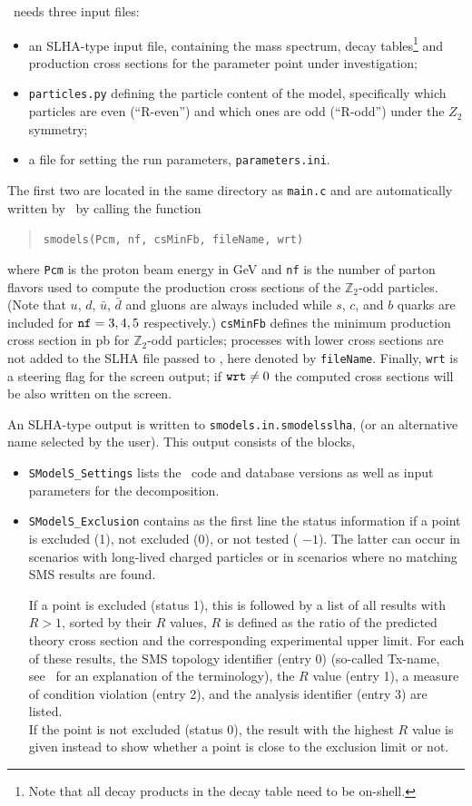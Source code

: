 \documentclass[12pt,a4paper]{article}
\begin{document}
{\smodels\ needs three input files:
%
\begin{itemize}
\item an SLHA-type input file,  
containing the mass
spectrum, decay tables\footnote{Note that all decay products in the decay table need to be on-shell.} and production cross sections for the parameter point under investigation;
\item {\tt particles.py} defining the particle content of the model, specifically which particles are even (``R-even'') 
and which ones are odd (``R-odd'') under the ${Z}_2$ symmetry;
\item a file for setting the run parameters, {\tt parameters.ini}.
\end{itemize}
%
 The first two are located in the same directory as {\tt main.c} and 
are automatically written by \micro\ by calling the function
\begin{quote}
  \verb|smodels(Pcm, nf, csMinFb, fileName, wrt)|
\end{quote}  
where \verb|Pcm| is the proton beam energy in GeV and \verb|nf| is the number of parton flavors used to compute the production cross sections of the $\mathbb{Z}_2$-odd particles. 
(Note that $u$, $d$, $\bar{u}$, $\bar{d}$  and gluons are always included  while  $s$, $c$, and $b$ quarks are included for ${\tt nf} = 3,4,5$ respectively.)
{\tt csMinFb} defines the minimum production cross section in pb for $\mathbb{Z}_2$-odd   particles; processes with lower cross sections are not added to the SLHA file passed to \smodels, here denoted by  {\tt fileName}. 
Finally, {\tt wrt} is a steering flag for the screen output; if ${\tt wrt} \ne 0$  the computed cross sections will be also written on the screen.


An SLHA-type output  is written to {\tt smodels.in.smodelsslha},
(or an alternative name selected by the user).
This output consists of the blocks, 
\begin{itemize}
\item {\tt SModelS\_Settings} lists the \smodels\ code and database versions as well as input parameters for the decomposition. 
\item {\tt SModelS\_Exclusion} 
contains as the first line the status information if a point is excluded (1), not excluded (0),  or not tested ( $-1$). 
The latter can occur in scenarios with long-lived charged particles or in scenarios where no matching SMS results are found. 

If a point is excluded (status 1), this is followed by a list of all results with $R>1$, sorted by their $R$ values,  $R$ is defined as the ratio of the predicted theory cross section and the corresponding experimental upper limit.
For each of these results, the SMS topology identifier (entry 0) (so-called Tx-name, see~\cite{SMS_dictionary} for an explanation of the terminology), 
the $R$ value (entry 1), a measure of condition violation (entry 2), and the analysis identifier (entry 3) are listed.\\
If the point is not excluded (status 0), the result with the highest $R$ value is given instead to show whether a point is close to the exclusion limit or not. 



\end{itemize}}
\end{document}
